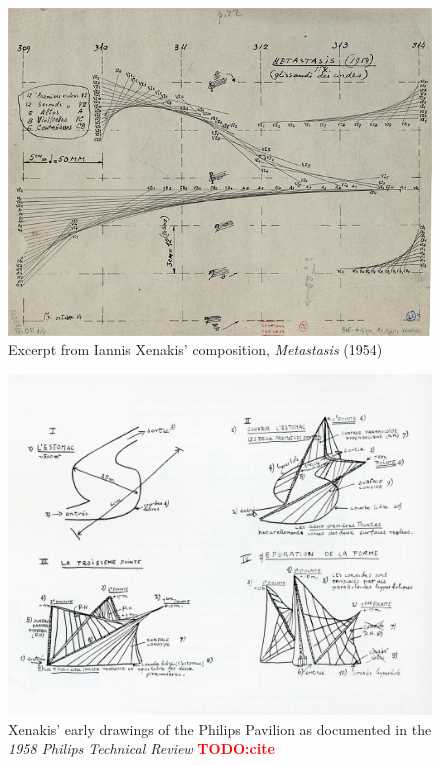 \documentclass{tufte-book}
\newcommand{\TODO}[1]{\textcolor{red}{\bf TODO:#1}\xspace}
\begin{document}
\begin{figure}[h]
  \includegraphics[width=\linewidth]{XenakisMetastasis.jpg}
  \caption{Excerpt from Iannis Xenakis' composition, \textit{Metastasis} (1954)}
  \label{fig:metastasis}
\end{figure}

\begin{figure}[h]
  \includegraphics[width=\linewidth]{PhilipsDrawings.jpg}
  \caption{Xenakis' early drawings of the Philips Pavilion as
    documented in the \textit{1958 Philips Technical Review} \TODO{cite}}
  \label{fig:xenakis-draw}
\end{figure}
\end{document}
